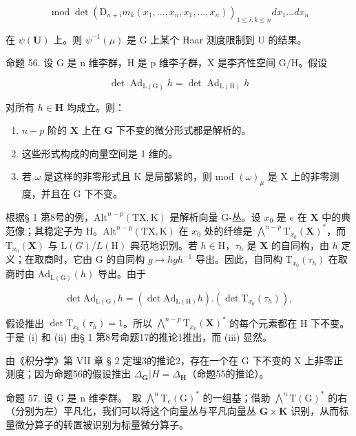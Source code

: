 \[
\operatorname{mod} \det (\mathrm{D} _ {n + i} m _ {k} (x _ {1}, \dots , x _ {n}, x _ {1}, \dots , x _ {n})) _ {1 \leqslant i, k \leqslant n} d x _ {1} \dots d x _ {n}
\]

在 \(\psi (\mathbf{U})\) 上。则 \(\psi^{-1}(\mu)\) 是 G 上某个 Haar 测度限制到 U 的结果。

命题 56. 设 G 是 n 维李群，H 是 p 维李子群，X 是李齐性空间 G/H。假设

\[
\det \operatorname{Ad} _ {\mathrm{L} (\mathrm{G})} h = \det \operatorname{Ad} _ {\mathrm{L} (\mathrm{H})} h
\]

对所有 \(h\in \mathbf{H}\) 均成立。则：

\begin{enumerate}
\def\labelenumi{(\roman{enumi})}
\item
  \(n - p\) 阶的 \(\mathbf{X}\) 上在 \(\mathbf{G}\) 下不变的微分形式都是解析的。
\item
  这些形式构成的向量空间是 1 维的。
\item
  若 \(\omega\) 是这样的非零形式且 K 是局部紧的，则 mod \((\omega)_{\mu}\) 是 X 上的非零测度，并且在 G 下不变。
\end{enumerate}

根据§ 1 第8号的例，\(\mathrm{Alt}^{n - p}(\mathrm{TX},\mathrm{K})\) 是解析向量 G-丛。设 \(x_0\) 是 \(e\) 在 \(\mathbf{X}\) 中的典范像；其稳定子为 H。\(\mathrm{Alt}^{n - p}(\mathrm{TX},\mathrm{K})\) 在 \(x_0\) 处的纤维是 \(\bigwedge^{n - p}\mathrm{T}_{x_0}(\mathbf{X})^*\)，而 \(\mathrm{T}_{x_0}(\mathbf{X})\) 与 \(\mathrm{L}(G) / L(\mathrm{H})\) 典范地识别。若 \(h\in \mathrm{H}\)，\(\tau_h\) 是 \(\mathbf{X}\) 的自同构，由 \(h\) 定义；在取商时，它由 G 的自同构 \(g\mapsto hgh^{-1}\) 导出。因此，自同构 \(\mathrm{T}_{x_0}(\tau_h)\) 在取商时由 \(\mathrm{Ad}_{\mathrm{L(G)}}(h)\) 导出。由于

\[
\det \mathrm{Ad} _ {\mathrm{L(G)}} h = (\det \mathrm{Ad} _ {\mathrm{L(H)}} h). (\det \mathrm{T} _ {x _ {0}} (\tau_ {h})),
\]

假设推出 \(\det \mathrm{T}_{x_0}(\tau_h) = 1\)。所以 \(\bigwedge^{n - p}\mathrm{T}_{x_0}(\mathbf{X})^*\) 的每个元素都在 H 下不变。于是 (i) 和 (ii) 由§ 1 第8号命题17的推论1推出，而 (iii) 显然。

由《积分学》第 VII 章 § 2 定理3的推论2，存在一个在 G 下不变的 X 上非零正测度；因为命题56的假设推出 \(\Delta_{\mathbf{G}}|H = \Delta_{\mathbf{H}}\)（命题55的推论）。

命题 57. 设 G 是 n 维李群。~取 \(\bigwedge^{n}\mathrm{T}_{e}(\mathrm{G})^{*}\) 的一组基；借助 \(\bigwedge^{n}\mathrm{T}(\mathrm{G})^{*}\) 的右（分别为左）平凡化，我们可以将这个向量丛与平凡向量丛 \(\mathbf{G} \times \mathbf{K}\) 识别，从而标量微分算子的转置被识别为标量微分算子。

